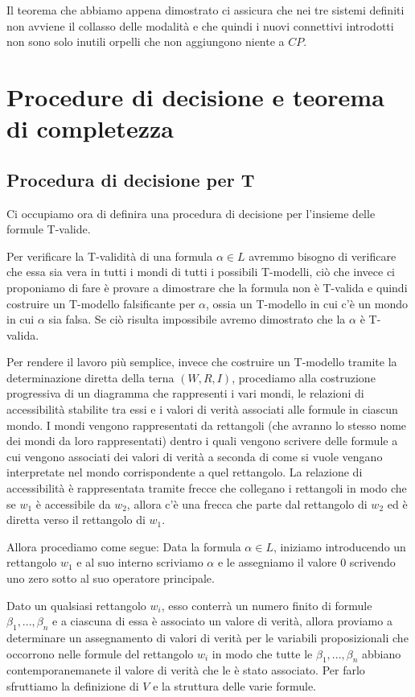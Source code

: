 \documentclass[a4paper, titlepage, 12pt]{report}
\begin{document}
Il teorema che abbiamo appena dimostrato ci assicura che nei tre sistemi definiti non avviene
il collasso delle modalità e che quindi i nuovi connettivi introdotti non sono solo inutili
orpelli che non aggiungono niente a $CP$.

\chapter{Procedure di decisione e teorema di completezza}

\section{Procedura di decisione per T}
Ci occupiamo ora di definira una procedura di decisione per l'insieme delle formule T-valide.

Per verificare la T-validità di una formula $\alpha \in L$ avremmo bisogno di verificare che essa sia vera in tutti
i mondi di tutti i possibili T-modelli, ciò che invece ci proponiamo di fare è
provare a dimostrare che la formula non è T-valida e quindi costruire un T-modello
falsificante per $\alpha$, ossia un T-modello in cui c'è un mondo in cui $\alpha$ sia falsa.
Se ciò risulta impossibile avremo dimostrato che la $\alpha$ è T-valida.

Per rendere il lavoro più semplice, invece che costruire un T-modello
tramite la determinazione diretta della terna $(W, R, I)$, procediamo alla costruzione
progressiva di un diagramma che rappresenti i vari mondi, le relazioni di accessibilità
stabilite tra essi e i valori di verità associati alle formule in ciascun mondo.
I mondi vengono rappresentati da rettangoli (che avranno lo stesso nome dei mondi
da loro rappresentati) dentro i quali
vengono scrivere delle formule a cui vengono associati
dei valori di verità a seconda di come si vuole vengano interpretate nel mondo
corrispondente a quel rettangolo. La relazione di accessibilità è rappresentata
tramite frecce che collegano i rettangoli in modo che se $w_1$ è accessibile da $w_2$,
allora c'è una frecca che parte dal rettangolo di $w_2$ ed è diretta verso il rettangolo
di $w_1$.


Allora procediamo come segue:
Data la formula $\alpha \in L$, iniziamo introducendo un rettangolo $w_1$ e
al suo interno scriviamo $\alpha$ e le assegniamo il valore $0$ scrivendo uno zero
sotto al suo operatore principale.

Dato un qualsiasi rettangolo $w_i$, esso conterrà un numero finito di formule
$\beta_1, ..., \beta_n$
e a ciascuna di essa è associato un valore di verità, allora proviamo
a determinare un assegnamento di valori di verità per le variabili proposizionali
che occorrono nelle formule del rettangolo $w_i$
in modo che tutte le $\beta_1, ..., \beta_n$
abbiano contemporanemanete il valore di verità che le è stato associato.
Per farlo sfruttiamo la definizione di $V$ e la struttura delle varie formule.
\end{document}
